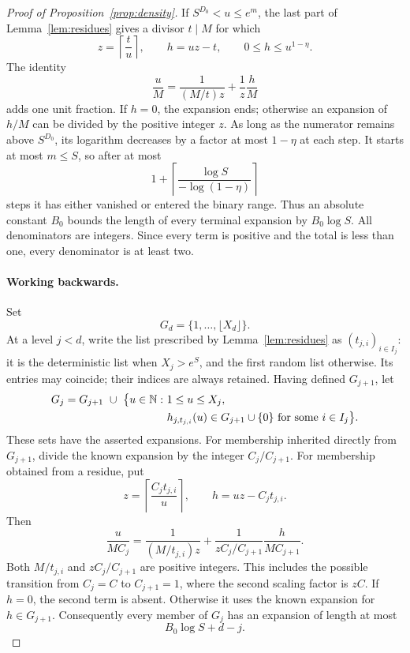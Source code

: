 \begin{proof}[Proof of Proposition~\ref{prop:density}]
If \(S^{D_0}<u\le e^m\), the last part of Lemma~\ref{lem:residues}
gives a divisor \(t\mid M\) for which
\[
 z=\left\lceil\frac tu\right\rceil,\qquad
 h=uz-t,\qquad 0\le h\le u^{1-\eta}.
\]
The identity
\begin{equation}\label{eq:terminal-descent}
 \frac uM=\frac1{(M/t)z}+\frac1z\frac hM
\end{equation}
adds one unit fraction.  If \(h=0\), the expansion ends; otherwise an
expansion of \(h/M\) can be divided by the positive integer \(z\).
As long as the numerator remains above \(S^{D_0}\), its logarithm
decreases by a factor at most \(1-\eta\) at each step.  It starts at most
\(m\le S\), so after at most
\[
 1+\left\lceil\frac{\log S}{-\log(1-\eta)}\right\rceil
\]
steps it has either vanished or entered the binary range.  Thus an absolute constant
\(B_0\) bounds the length of every terminal expansion by \(B_0\log S\).
All denominators are integers.  Since every term is positive and the
total is less than one, every denominator is at least two.

\paragraph{Working backwards.}
Set
\[
 G_d=\{1,\ldots,\lfloor X_d\rfloor\}.
\]
At a level \(j<d\), write the list prescribed by
Lemma~\ref{lem:residues} as \((t_{j,i})_{i\in I_j}\):
it is the deterministic list when \(X_j>e^S\), and the first random
list otherwise.  Its entries may coincide; their indices are always
retained.  Having defined \(G_{j+1}\), let
\begin{equation}\label{eq:good-backwards}
 \begin{aligned}
 G_j=G_{j+1}\ \cup\ \bigl\{u\in\mathbb N:\ &1\le u\le X_j,\\
 &h_{j,t_{j,i}}(u)\in G_{j+1}\cup\{0\}
       \text{ for some }i\in I_j\bigr\}.
 \end{aligned}
\end{equation}
These sets have the asserted expansions.  For membership inherited
directly from \(G_{j+1}\), divide the known expansion by the integer
\(C_j/C_{j+1}\).  For membership obtained from a residue, put
\[
 z=\left\lceil\frac{C_jt_{j,i}}u\right\rceil,\qquad
 h=uz-C_jt_{j,i}.
\]
Then
\begin{equation}\label{eq:rescaled-descent}
 \frac{u}{MC_j}
 =\frac1{(M/t_{j,i})z}
 +\frac1{zC_j/C_{j+1}}\frac{h}{MC_{j+1}}.
\end{equation}
Both \(M/t_{j,i}\) and \(zC_j/C_{j+1}\) are positive integers.
This includes the possible transition from \(C_j=C\) to
\(C_{j+1}=1\), where the second scaling factor is \(zC\).
If \(h=0\), the second term is absent.  Otherwise it uses the known
expansion for \(h\in G_{j+1}\).  Consequently every member of \(G_j\)
has an expansion of length at most
\begin{equation}\label{eq:descent-length}
 B_0\log S+d-j.
\end{equation}


\end{proof}
